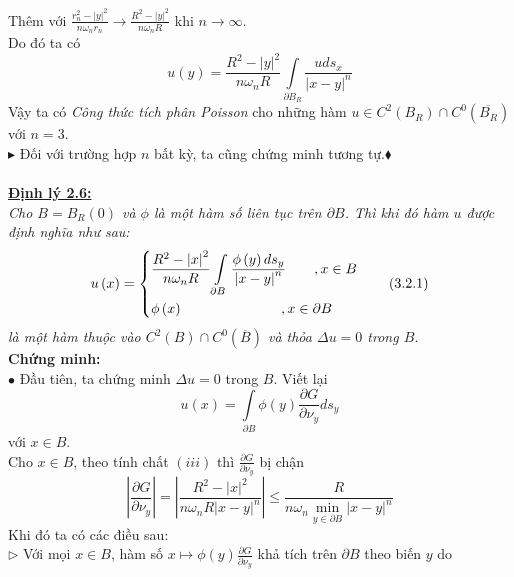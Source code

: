 Thêm với $
\frac{{r_n ^2  - \left| y \right|^2 }}
{{n\omega _n r_n }} \to \frac{{R^2  - \left| y \right|^2 }}
{{n\omega _n R}}
$ khi $
n \to \infty 
$.\\
Do đó ta có
\[
u\left( y \right) = \frac{{R^2  - \left| y \right|^2 }}
{{n\omega _n R}}\int\limits_{\partial B_R } {\frac{{uds_x }}
{{\left| {x - y} \right|^n }}} 
\]
Vậy ta có {\it Công thức tích phân Poisson} cho những hàm $
u \in C^2 \left( {B_R } \right) \cap C^0 \left( {\overline {B_R } } \right)
$ với $n=3$.\\
$\blacktriangleright$ Đối với trường hợp $n$ bất kỳ, ta cũng chứng minh tương tự.$\blacklozenge$
\\
\\
\textbf{\underline{Định lý 2.6:} }
\\
{\it Cho $
B = B_R \left( 0 \right)
$ và $
\phi 
$ là một hàm số liên tục trên $
\partial B
$. Thì khi đó hàm $u$ được định nghĩa như sau:
\[
u\left( x \right) = \left\{ \begin{gathered}
  \frac{{R^2  - \left| x \right|^2 }}
{{n\omega _n R}}\int\limits_{\partial B} {\frac{{\phi \left( y \right)ds_y }}
{{\left| {x - y} \right|^n }}} \quad \quad ,x \in B \hfill \\
  \phi \left( x \right)\quad \quad \quad \quad \quad \quad \quad ,x \in \partial B \hfill \\ 
\end{gathered}  \right.\quad \quad \left( {3.2.1} \right)
\]
là một hàm thuộc vào $
C^2 \left( B \right) \cap C^0 \left( {\overline B } \right)
$ và thỏa $
\Delta u = 0
$ trong $B$.}
\\
{\bf Chứng minh:}\\
$\bullet$ Đầu tiên, ta chứng minh $
\Delta u = 0
$ trong $B$.
Viết lại \[
u\left( x \right) = \int\limits_{\partial B} {\phi \left( y \right)\frac{{\partial G}}
{{\partial \nu _y }}ds_y } 
\]
với $
x \in B
$.\\
Cho $
x \in B
$, theo tính chất $
\left( {iii} \right)
$ thì $
{\frac{{\partial G}}
{{\partial \nu _y }}}
$ bị chận
\[
\left| {\frac{{\partial G}}
{{\partial \nu _y }}} \right| = \left| {\frac{{R^2  - \left| x \right|^2 }}
{{n\omega _n R\left| {x - y} \right|^n }}} \right| \leqslant \frac{R}
{{n\omega _n \mathop {\min }\limits_{y \in \partial B} \left| {x - y} \right|^n }}
\]
Khi đó ta có các điều sau:\\
$\triangleright$ Với mọi $
x \in B
$, hàm số $
x \mapsto \phi \left( y \right)\frac{{\partial G}}
{{\partial \nu _y }}
$ khả tích trên $
\partial B
$ theo biến $y$ do
